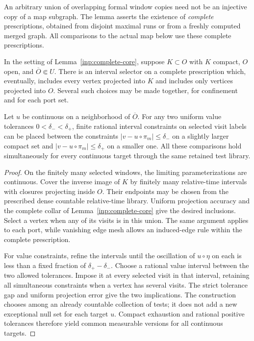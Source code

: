 An arbitrary union of overlapping formal window copies need not be
an injective copy of a map subgraph.  The lemma asserts the existence
of \emph{complete} prescriptions, obtained from disjoint maximal
runs or from a freshly computed merged graph.  All comparisons to
the actual map below use these complete prescriptions.

\begin{lemma}\label{inp:sandwich}
In the setting of Lemma~\ref{inp:complete-core}, suppose
$K\subset O$ with $K$ compact, $O$ open, and
$\overline O\Subset U$.  There is an interval selector on a complete
prescription which, eventually, includes every vertex projected into
$K$ and includes only vertices projected into $O$.  Several such
choices may be made together, for confinement and for each port set.

Let $u$ be continuous on a neighborhood of $\overline O$.  For any
two uniform value tolerances $0<\delta_-<\delta_+$, finite rational
interval constraints on selected visit labels can be placed between
the constraints $|v-u\circ\pi_m|\le\delta_-$ on a slightly larger
compact set and $|v-u\circ\pi_m|\le\delta_+$ on a smaller one.
All these comparisons hold simultaneously for every continuous
target through the same retained test library.
\end{lemma}

\begin{proof}
On the finitely many selected windows, the limiting parameterizations
are continuous.  Cover the inverse image of $K$ by finitely many
relative-time intervals with closures projecting inside $O$.
Their endpoints may be chosen from the prescribed dense countable
relative-time library.  Uniform projection accuracy and the complete
collar of Lemma~\ref{inp:complete-core} give the desired inclusions.
Select a vertex when any of its visits is in this union.  The same
argument applies to each port, while vanishing edge mesh allows an
induced-edge rule within the complete prescription.

For value constraints, refine the intervals until the oscillation of
$u\circ\eta$ on each is less than a fixed fraction of
$\delta_+-\delta_-$.  Choose a rational value interval between the
two allowed tolerances.  Impose it at every selected visit in that
interval, retaining all simultaneous constraints when a vertex has
several visits.  The strict tolerance gap and uniform projection
error give the two implications.  The construction chooses among
an already countable collection of tests; it does not add a new
exceptional null set for each target $u$.  Compact exhaustion and
rational positive tolerances therefore yield common measurable
versions for all continuous targets.
\end{proof}

